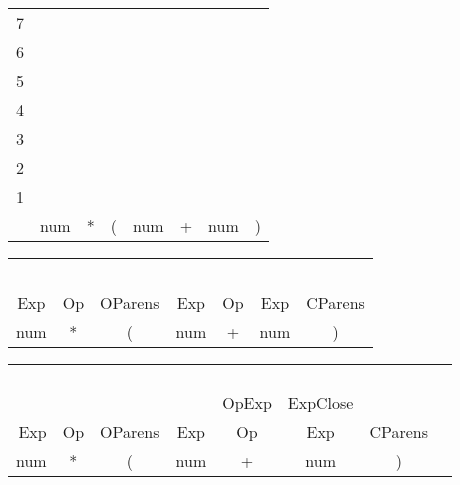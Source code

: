 \documentclass[fleqn]{article}
\begin{document}
\vspace{0.5in}

\begin{tabular}{r | c | c | c | c  | c | c | c|}
\cline{2-2}
7 &\\\cline{2-3}
6 && \\\cline{2-4}
5 && & \\\cline{2-5}
4 && & & \\\cline{2-6}
3 && & & & \\\cline{2-7}
2 && & & & & \\\cline{2-8}
1 & & & & & & & \\\cline{2-8}
& num & * & ( & num & + & num & ) \\\cline{2-8}
\cline {2-8}

\end{tabular}

\vspace{0.5in}
\begin{tabular}{ | c | c | c | c  | c | c | c|}
\cline{1-1}
\\\cline{1-2}
 & \\\cline{1-3}
 & & \\\cline{1-4}
 & & & \\\cline{1-5}
 & & & & \\\cline{1-6}
 & & & & & \\\cline{1-7}
 Exp & Op &OParens & Exp & Op & Exp & CParens \\\cline{1-7}
\hline num & * & ( & num & + & num & ) \\
\hline

\end{tabular}

\vspace{0.5in}

\begin{tabular}{ r | c | c | c | c  | c | c | c|}
\cline{1-1}
\\\cline{1-2}
 & \\\cline{1-3}
 & & \\\cline{1-4}
 & & & \\\cline{1-5}
 & & & & \\\cline{1-6}
 & & & & OpExp & ExpClose  \\\cline{1-7}
 Exp & Op & OParens & Exp & Op & Exp & CParens \\\cline{1-7}
\hline num & * & ( & num & + & num & ) \\
\hline

\end{tabular}
\end{document}
